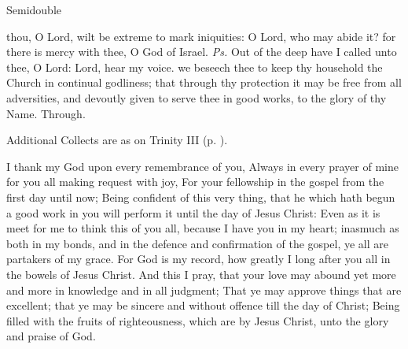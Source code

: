 \begin{inhead}
{Semidouble}
\end{inhead}
\par\noindent
{}

\introit
{} thou, O Lord, wilt be extreme to mark iniquities: O Lord, who may abide it? for there is mercy with thee, O God of Israel. \textit{Ps.} Out of the deep have I called unto thee, O Lord: Lord, hear my voice.
\collect
{} we beseech thee to keep thy household the Church in continual godliness; that through thy protection it may be free from all adversities, and devoutly given to serve thee in good works, to the glory of thy Name. Through.
\begin{rubric}
    Additional Collects are as on Trinity III (p. \pageref{TrinityIII}).
\end{rubric}

 I thank my God upon every remembrance of you, Always in every prayer of mine for you all making request with joy, For your fellowship in the gospel from the first day until now; Being confident of this very thing, that he which hath begun a good work in you will perform it until the day of Jesus Christ: Even as it is meet for me to think this of you all, because I have you in my heart; inasmuch as both in my bonds, and in the defence and confirmation of the gospel, ye all are partakers of my grace. For God is my record, how greatly I long after you all in the bowels of Jesus Christ. And this I pray, that your love may abound yet more and more in knowledge and in all judgment; That ye may approve things that are excellent; that ye may be sincere and without offence till the day of Christ; Being filled with the fruits of righteousness, which are by Jesus Christ, unto the glory and praise of God.


